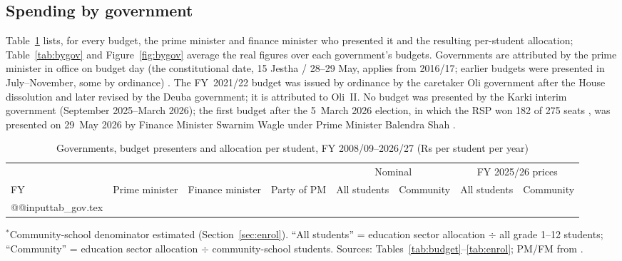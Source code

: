 \documentclass[11pt,a4paper]{article}
\begin{document}
\subsection{Spending by government}
Table~\ref{tab:gov} lists, for every budget, the prime minister and finance minister who presented it and the resulting per-student allocation; Table~\ref{tab:bygov} and Figure~\ref{fig:bygov} average the real figures over each government's budgets. Governments are attributed by the prime minister in office on budget day (the constitutional date, 15 Jestha / 28--29 May, applies from 2016/17; earlier budgets were presented in July--November, some by ordinance) \cite{wiki_fm,drcn2024}. The FY~2021/22 budget was issued by ordinance by the caretaker Oli government after the House dissolution and later revised by the Deuba government; it is attributed to Oli~II. No budget was presented by the Karki interim government (September 2025--March 2026); the first budget after the 5~March 2026 election, in which the RSP won 182 of 275 seats \cite{commons2026}, was presented on 29~May 2026 by Finance Minister Swarnim Wagle under Prime Minister Balendra Shah \cite{wiki_shah,ican2026}.

\begin{table}[htbp]\centering\footnotesize
\caption{Governments, budget presenters and allocation per student, FY 2008/09--2026/27 (Rs per student per year)}\label{tab:gov}
\setlength{\tabcolsep}{3.5pt}
\begin{tabular}{l>{\raggedright\arraybackslash}p{2.6cm}>{\raggedright\arraybackslash}p{2.5cm}>{\raggedright\arraybackslash}p{2.1cm}rrrr}\toprule
 & & & & \multicolumn{2}{c}{Nominal} & \multicolumn{2}{c}{FY 2025/26 prices} \\\cmidrule(lr){5-6}\cmidrule(lr){7-8}
FY & Prime minister & Finance minister & Party of PM & All students & Community & All students & Community \\\midrule
\csname @@input\endcsname tab_gov.tex 
\bottomrule\end{tabular}
\par\smallskip\raggedright $^\ast$Community-school denominator estimated (Section~\ref{sec:enrol}). ``All students'' = education sector allocation $\div$ all grade 1--12 students; ``Community'' = education sector allocation $\div$ community-school students. Sources: Tables~\ref{tab:budget}--\ref{tab:enrol}; PM/FM from \cite{wiki_fm,drcn2024,wiki_shah,commons2026}.
\end{table}
\end{document}
